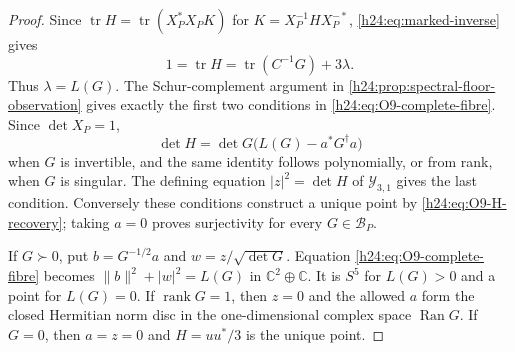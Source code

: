 
\begin{proof}
Since $\operatorname{tr} H=\operatorname{tr}(X_P^*X_PK)$ for
$K=X_P^{-1}HX_P^{-*}$, \eqref{h24:eq:marked-inverse} gives
\[
 1=\operatorname{tr} H=\operatorname{tr}(C^{-1}G)+3\lambda.
\]
Thus $\lambda=L(G)$.  The Schur-complement argument in
\cref{h24:prop:spectral-floor-observation} gives exactly the first two
conditions in \eqref{h24:eq:O9-complete-fibre}.  Since $\det X_P=1$,
\[
 \det H=\det G\bigl(L(G)-a^*G^\dagger a\bigr)
\]
when $G$ is invertible, and the same identity follows polynomially, or from
rank, when $G$ is singular.  The defining equation
$|z|^2=\det H$ of $\mathcal Y_{3,1}$ gives the last condition.  Conversely
these conditions construct a unique point by \eqref{h24:eq:O9-H-recovery};
taking $a=0$ proves surjectivity for every $G\in\mathcal B_P$.

If $G\succ0$, put $b=G^{-1/2}a$ and
$w=z/\sqrt{\det G}$.  Equation \eqref{h24:eq:O9-complete-fibre} becomes
$\|b\|^2+|w|^2=L(G)$ in $\mathbb C^2\oplus\mathbb C$.  It is $S^5$ for $L(G)>0$ and a
point for $L(G)=0$.  If $\operatorname{rank} G=1$, then $z=0$ and the allowed $a$ form
the closed Hermitian norm disc in the one-dimensional complex space
$\operatorname{Ran}G$.  If $G=0$, then $a=z=0$ and
$H=uu^*/3$ is the unique point.
\end{proof}

